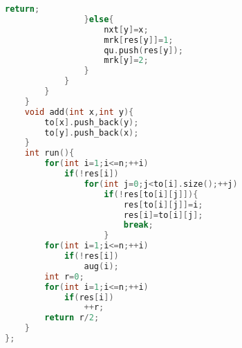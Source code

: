 \documentclass{book}
\begin{document}
\begin{lstlisting}[language=C++,title={General Graph Maximum Matching.hpp (3123 bytes, 112 lines)}]
                    return;
                }else{
                    nxt[y]=x;
                    mrk[res[y]]=1;
                    qu.push(res[y]);
                    mrk[y]=2;
                }
            }
        }
    }
    void add(int x,int y){
        to[x].push_back(y);
        to[y].push_back(x);
    }
    int run(){
        for(int i=1;i<=n;++i)
            if(!res[i])
                for(int j=0;j<to[i].size();++j)
                    if(!res[to[i][j]]){
                        res[to[i][j]]=i;
                        res[i]=to[i][j];
                        break;
                    }
        for(int i=1;i<=n;++i)
            if(!res[i])
                aug(i);
        int r=0;
        for(int i=1;i<=n;++i)
            if(res[i])
                ++r;
        return r/2;
    }
};
\end{lstlisting}
\end{document}
